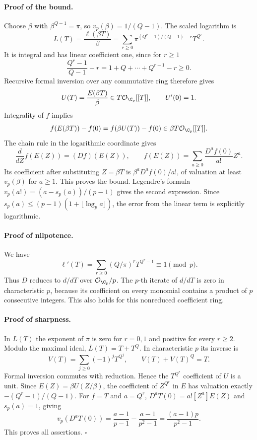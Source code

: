 \documentclass[11pt]{article}
\theoremstyle{definition}\newtheorem{definition}[theorem]{Definition}\newtheorem{remark}[theorem]{Remark}
\begin{document}
\paragraph{Proof of the bound.}
Choose $\beta$ with $\beta^{Q-1}=\pi$, so
$v_p(\beta)=1/(Q-1)$. The scaled logarithm is
\[
 L(T)=\frac{\ell(\beta T)}\beta
 =\sum_{r\geq0}
     \pi^{(Q^r-1)/(Q-1)-r}T^{Q^r}.
\]
It is integral and has linear coefficient one, since for $r\geq1$
\[
 \frac{Q^r-1}{Q-1}-r=1+Q+\cdots+Q^{r-1}-r\geq0.
\]
Recursive formal inversion over any commutative ring therefore gives
\[
 U(T)=\frac{E(\beta T)}\beta
       \in T\mathcal O_{\C_p}[[T]],\qquad U'(0)=1.
\]
Integrality of $f$ implies
\[
 f(E(\beta T))-f(0)=f(\beta U(T))-f(0)
                         \in\beta T\mathcal O_{\C_p}[[T]].
\]
The chain rule in the logarithmic coordinate gives
\[
 \frac{d}{dZ}f(E(Z))=(Df)(E(Z)),\qquad
 f(E(Z))=\sum_{a\geq0}\frac{D^af(0)}{a!}Z^a.
\]
Its coefficient after substituting $Z=\beta T$ is
$\beta^aD^af(0)/a!$, of valuation at least $v_p(\beta)$ for
$a\geq1$. This proves the bound. Legendre's formula
$v_p(a!)=(a-s_p(a))/(p-1)$ gives the second expression. Since
$s_p(a)\leq(p-1)(1+\lfloor\log_pa\rfloor)$, the error from the
linear term is explicitly logarithmic.

\paragraph{Proof of nilpotence.}
We have
\[
 \ell'(T)=\sum_{r\geq0}(Q/\pi)^rT^{Q^r-1}\equiv1\pmod p.
\]
Thus $D$ reduces to $d/dT$ over $\mathcal O_{\C_p}/p$.
The $p$-th iterate of $d/dT$ is zero in characteristic $p$, because
its coefficient on every monomial contains a product of $p$
consecutive integers. This also holds for this nonreduced
coefficient ring.

\paragraph{Proof of sharpness.}
In $L(T)$ the exponent of $\pi$ is zero for $r=0,1$ and positive
for every $r\geq2$. Modulo the maximal ideal,
$\overline L(T)=T+T^Q$. In characteristic $p$ its inverse is
\[
 V(T)=\sum_{j\geq0}(-1)^jT^{Q^j},\qquad V(T)+V(T)^Q=T.
\]
Formal inversion commutes with reduction. Hence the
$T^{Q^r}$ coefficient of $U$ is a unit. Since
$E(Z)=\beta U(Z/\beta)$, the coefficient of $Z^{Q^r}$ in $E$
has valuation exactly $-(Q^r-1)/(Q-1)$. For $f=T$ and $a=Q^r$,
$D^aT(0)=a![Z^a]E(Z)$ and $s_p(a)=1$, giving
\[
 v_p(D^aT(0))=
 \frac{a-1}{p-1}-\frac{a-1}{p^2-1}
 =\frac{(a-1)p}{p^2-1}.
\]
This proves all assertions. $\square$
\end{document}
